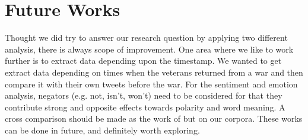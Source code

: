 \section{Future Works}

Thought we did try to answer our research question by applying two different analysis, there is always scope of improvement. One area where we like to work further is to extract data depending upon the timestamp. We wanted to get extract data depending on times when the veterans returned from a war and then compare it with their own tweets before the war. For the sentiment and emotion analysis, negators (e.g. not, isn't, won't) need to be considered for that they contribute strong and opposite effects towards polarity and word meaning. A cross comparison should be made as the work of \cite{emoIntenT} but on our corpora. These works can be done in future, and definitely worth exploring.
